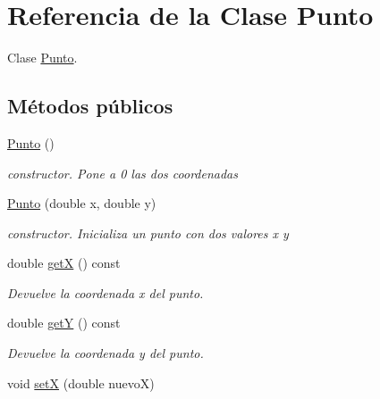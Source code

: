 \hypertarget{classPunto}{\section{Referencia de la Clase Punto}
\label{classPunto}
}


Clase \hyperlink{classPunto}{Punto}.  


\subsection*{Métodos públicos}
\begin{DoxyCompactItemize}
\item 
\hypertarget{classPunto_a4b8b70b933ff13493ee5ddb3c8532c10}{\hyperlink{classPunto_a4b8b70b933ff13493ee5ddb3c8532c10}{Punto} ()}\label{classPunto_a4b8b70b933ff13493ee5ddb3c8532c10}

\begin{DoxyCompactList}\small\item\em constructor. Pone a 0 las dos coordenadas \end{DoxyCompactList}\item 
\hypertarget{classPunto_a911bb8d88eaa1f9904a27b0e159a51c0}{\hyperlink{classPunto_a911bb8d88eaa1f9904a27b0e159a51c0}{Punto} (double x, double y)}\label{classPunto_a911bb8d88eaa1f9904a27b0e159a51c0}

\begin{DoxyCompactList}\small\item\em constructor. Inicializa un punto con dos valores x y \end{DoxyCompactList}\item 
\hypertarget{classPunto_aa218292fec9bad5ec6d71d4bd9173d9d}{double \hyperlink{classPunto_aa218292fec9bad5ec6d71d4bd9173d9d}{get\-X} () const }\label{classPunto_aa218292fec9bad5ec6d71d4bd9173d9d}

\begin{DoxyCompactList}\small\item\em Devuelve la coordenada x del punto. \end{DoxyCompactList}\item 
\hypertarget{classPunto_a214978b8bbae48ca5927f2e56fb3bd22}{double \hyperlink{classPunto_a214978b8bbae48ca5927f2e56fb3bd22}{get\-Y} () const }\label{classPunto_a214978b8bbae48ca5927f2e56fb3bd22}

\begin{DoxyCompactList}\small\item\em Devuelve la coordenada y del punto. \end{DoxyCompactList}\item 
\hypertarget{classPunto_a51ae6616f828bb2b4111bc8ace49dbca}{void \hyperlink{classPunto_a51ae6616f828bb2b4111bc8ace49dbca}{set\-X} (double nuevo\-X)}\label{classPunto_a51ae6616f828bb2b4111bc8ace49dbca}


\end{DoxyCompactItemize}
